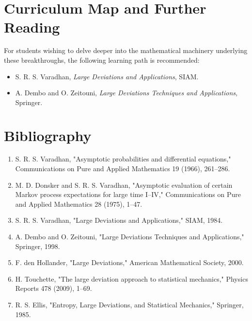 \section{Curriculum Map and Further Reading}
For students wishing to delve deeper into the mathematical machinery underlying these breakthroughs, the following learning path is recommended:
\begin{itemize}
  \item S. R. S. Varadhan, \emph{Large Deviations and Applications}, SIAM.
  \item A. Dembo and O. Zeitouni, \emph{Large Deviations Techniques and Applications}, Springer.
\end{itemize}

\section*{Bibliography}

\begin{enumerate}
\item S. R. S. Varadhan, "Asymptotic probabilities and differential equations," Communications on Pure and Applied Mathematics 19 (1966), 261--286.
\item M. D. Donsker and S. R. S. Varadhan, "Asymptotic evaluation of certain Markov process expectations for large time I--IV," Communications on Pure and Applied Mathematics 28 (1975), 1--47.
\item S. R. S. Varadhan, "Large Deviations and Applications," SIAM, 1984.
\item A. Dembo and O. Zeitouni, "Large Deviations Techniques and Applications," Springer, 1998.
\item F. den Hollander, "Large Deviations," American Mathematical Society, 2000.
\item H. Touchette, "The large deviation approach to statistical mechanics," Physics Reports 478 (2009), 1--69.
\item R. S. Ellis, "Entropy, Large Deviations, and Statistical Mechanics," Springer, 1985.
\end{enumerate}
